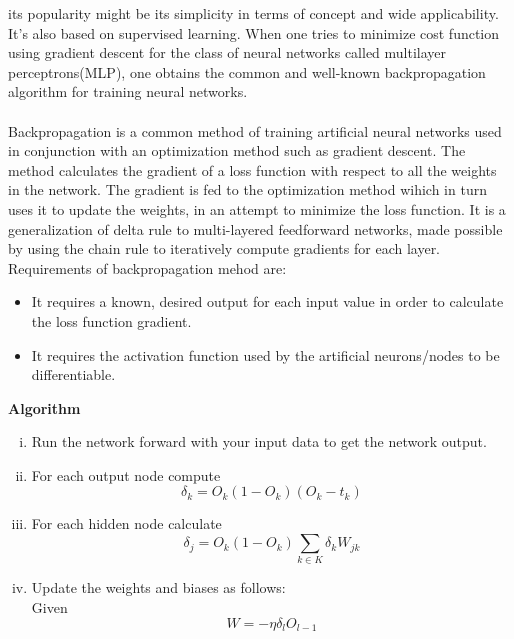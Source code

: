 {its popularity might be its simplicity in terms of concept and wide applicability. It's also based on supervised learning. When one tries to minimize cost function
using gradient descent for the class of neural networks called multilayer perceptrons(MLP), one obtains the common and well-known backpropagation algorithm for training neural networks.\\
\\
Backpropagation is a common method of training artificial neural networks used in conjunction with an optimization method such as gradient descent. The 
method calculates the gradient of a loss function with respect to all the weights in the network. The gradient is fed to the optimization method wihich in turn uses it to
update the weights, in an attempt to minimize the loss function. It is a generalization of delta rule to multi-layered feedforward networks, made possible
by using the chain rule to iteratively compute gradients for each layer. Requirements of backpropagation mehod are:
\begin{itemize}
        \item It requires a known, desired output for each input value in order to calculate the loss function gradient.
        \item It requires the activation function used by the artificial neurons/nodes to be differentiable.
\end{itemize}
\textbf{Algorithm}
\begin{enumerate}[(i)]
        \item Run the network forward with your input data to get the network output.
        \item For each output node compute
                \begin{equation}
                        \delta_k = O_k(1 - O_k)(O_k - t_k)
                \end{equation}
        \item For each hidden node calculate
                \begin{equation}
                        \delta_j = O_k(1 - O_k) \sum_{k \in K}{\delta_kW_{jk}}
                \end{equation}
        \item Update the weights and biases as follows:\\
                Given
                \begin{equation}
                        W = -\eta \delta_l O_{l-1}
                \end{equation}

\end{enumerate}}
